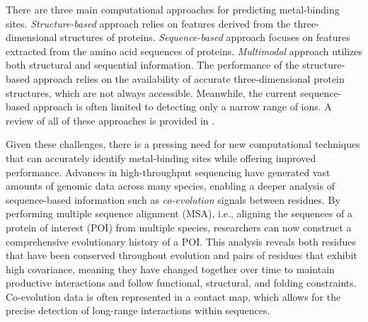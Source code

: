 \documentclass[letterpaper, 10 pt, conference]{ieeeconf}
\begin{document}
There are three main computational approaches for predicting metal-binding sites. \textit{Structure-based} approach relies on features derived from the three-dimensional structures of proteins\cite{lin2016mib, 10.1093/bioinformatics/btac534}. \textit{Sequence-based} approach focuses on features extracted from the amino acid sequences of proteins\cite{lmetalsite, mionic, cui2019predicting}. \textit{Multimodal} approach utilizes both structural and sequential information\cite{10.1093/bioinformatics/btaa110}. The performance of the structure-based approach relies on the availability of accurate three-dimensional protein structures, which are not always accessible. Meanwhile, the current sequence-based approach is often limited to detecting only a narrow range of ions\cite{mionic}. A review of all of these approaches is provided in \cite{XIA2024102793,ye2022comprehensive}.
 
Given these challenges, there is a pressing need for new computational techniques that can accurately identify metal-binding sites while offering improved performance. 
Advances in high-throughput sequencing have generated vast amounts of genomic data across many species, enabling a deeper analysis of sequence-based information such as \textit{co-evolution} signals between residues. By performing multiple sequence alignment (MSA), i.e., aligning the sequences of a protein of interest (POI) from multiple species, researchers can now construct a comprehensive evolutionary history of a POI. This analysis reveals both residues that have been conserved throughout evolution and pairs of residues that exhibit high covariance, meaning they have changed together over time to maintain productive interactions and follow functional, structural, and folding constraints\cite{chakrabarti2010structural, sandler2014functional}. Co-evolution data is often represented in a contact map, which allows for the precise detection of long-range interactions within sequences\cite{balakrishnan2011learning,morcos2011direct,gobel1994correlated, shindyalov1994can, jones2012psicov,martin2005using}.
\end{document}
